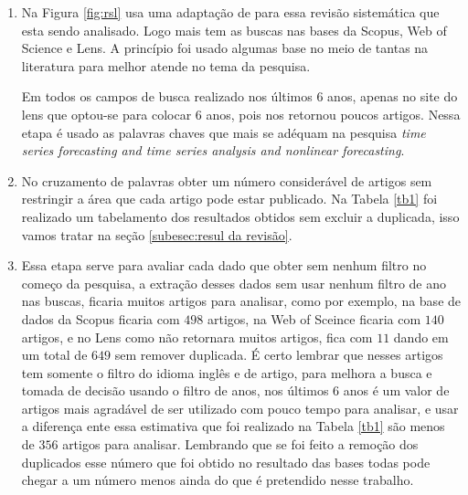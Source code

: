 \begin{enumerate}[start=1, label = {\textbf{Etapa} \arabic* } ]
\item \label{etp:rev-1}Na Figura \ref{fig:rsl} usa uma adaptação de  para essa revisão sistemática que esta sendo analisado. Logo mais tem as buscas nas bases da Scopus, Web of Science e Lens. A princípio foi usado algumas base no meio de tantas na literatura para melhor atende no tema da pesquisa.




Em todos os campos de busca realizado nos últimos 6 anos, apenas no site do lens que optou-se para colocar 6 anos, pois nos retornou poucos artigos. Nessa etapa é usado as palavras chaves que mais se adéquam na pesquisa \textit{time series forecasting and time series analysis and nonlinear forecasting}.

	\item \label{etp:rev-2} No cruzamento de palavras obter um número considerável de artigos sem restringir a área que cada artigo pode estar publicado. Na Tabela \ref{tb1} foi realizado um tabelamento dos resultados obtidos sem excluir a duplicada, isso vamos tratar na seção \ref{subesec:resul da revisão}.

\item \label{etp:rev-3}Essa etapa serve para avaliar cada dado que obter sem nenhum filtro no começo da pesquisa, a extração desses dados sem usar nenhum filtro de ano nas buscas, ficaria muitos artigos para analisar, como por exemplo, na base de dados da Scopus ficaria com $498$ artigos, na Web of Sceince ficaria com $140$ artigos, e no Lens como não retornara muitos artigos, fica com $11$ dando em um total de $649$ sem remover duplicada. É certo lembrar que nesses artigos tem somente o filtro do idioma inglês e de artigo, para melhora a busca e tomada de decisão usando o filtro de anos, nos últimos 6 anos é um valor de artigos mais agradável de ser utilizado com pouco tempo para analisar, e usar a diferença ente essa estimativa que foi realizado na Tabela \ref{tb1} são menos de $ 356 $ artigos para analisar. Lembrando que se foi feito a remoção dos duplicados esse número que foi obtido no resultado das bases todas pode chegar a um número menos ainda do que é pretendido nesse trabalho.


\end{enumerate}

